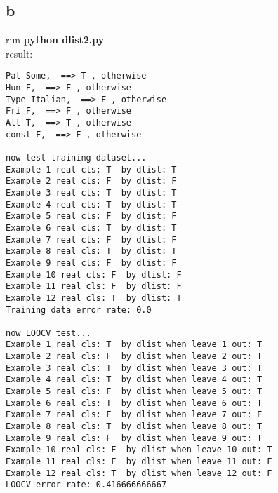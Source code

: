 \documentclass[12pt]{amsart}
\begin{document}
\subsection*{b}
run \textbf{python dlist2.py}\\
result:
\begin{verbatim}
Pat Some,  ==> T , otherwise
Hun F,  ==> F , otherwise
Type Italian,  ==> F , otherwise
Fri F,  ==> F , otherwise
Alt T,  ==> T , otherwise
const F,  ==> F , otherwise

now test training dataset...
Example 1 real cls: T  by dlist: T
Example 2 real cls: F  by dlist: F
Example 3 real cls: T  by dlist: T
Example 4 real cls: T  by dlist: T
Example 5 real cls: F  by dlist: F
Example 6 real cls: T  by dlist: T
Example 7 real cls: F  by dlist: F
Example 8 real cls: T  by dlist: T
Example 9 real cls: F  by dlist: F
Example 10 real cls: F  by dlist: F
Example 11 real cls: F  by dlist: F
Example 12 real cls: T  by dlist: T
Training data error rate: 0.0

now LOOCV test...
Example 1 real cls: T  by dlist when leave 1 out: T
Example 2 real cls: F  by dlist when leave 2 out: T
Example 3 real cls: T  by dlist when leave 3 out: T
Example 4 real cls: T  by dlist when leave 4 out: T
Example 5 real cls: F  by dlist when leave 5 out: T
Example 6 real cls: T  by dlist when leave 6 out: T
Example 7 real cls: F  by dlist when leave 7 out: F
Example 8 real cls: T  by dlist when leave 8 out: T
Example 9 real cls: F  by dlist when leave 9 out: T
Example 10 real cls: F  by dlist when leave 10 out: T
Example 11 real cls: F  by dlist when leave 11 out: F
Example 12 real cls: T  by dlist when leave 12 out: F
LOOCV error rate: 0.416666666667
\end{verbatim}
\end{document}
